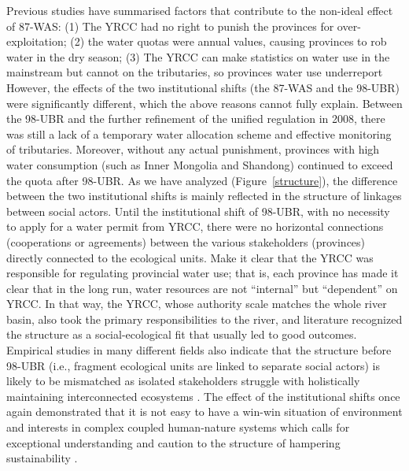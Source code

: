 Previous studies have summarised factors that contribute to the non-ideal effect of 87-WAS: (1) The YRCC had no right to punish the provinces for over-exploitation; (2) the water quotas were annual values, causing provinces to rob water in the dry season; (3) The YRCC can make statistics on water use in the mainstream but cannot on the tributaries, so provinces water use underreport %
However, the effects of the two institutional shifts (the 87-WAS and the 98-UBR) were significantly different, which the above reasons cannot fully explain.
Between the 98-UBR and the further refinement of the unified regulation in 2008, there was still a lack of a temporary water allocation scheme and effective monitoring of tributaries.
Moreover, without any actual punishment, provinces with high water consumption (such as Inner Mongolia and Shandong) continued to exceed the quota after 98-UBR.
As we have analyzed (Figure~\ref{structure}), the difference between the two institutional shifts is mainly reflected in the structure of linkages between social actors.
Until the institutional shift of 98-UBR, with no necessity to apply for a water permit from YRCC, there were no horizontal connections (cooperations or agreements) between the various stakeholders (provinces) directly connected to the ecological units.
Make it clear that the YRCC was responsible for regulating provincial water use; that is, each province has made it clear that in the long run, water resources are not ``internal'' but ``dependent'' on YRCC.
In that way, the YRCC, whose authority scale matches the whole river basin, also took the primary responsibilities to the river, and literature recognized the structure as a social-ecological fit that usually led to good outcomes.
Empirical studies in many different fields also indicate that the structure before 98-UBR (i.e., fragment ecological units are linked to separate social actors) is likely to be mismatched as isolated stakeholders struggle with holistically maintaining interconnected ecosystems
\cite{sayles2017,sayles2019,cai2016,bergsten2019}.
The effect of the institutional shifts once again demonstrated that it is not easy to have a win-win situation of environment and interests in complex coupled human-nature systems \cite{hegwood2022} which calls for exceptional understanding and caution to the structure of hampering sustainability \cite{bergsten2019, sayles2019}.
